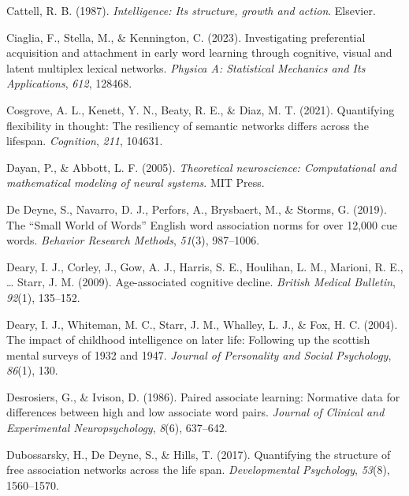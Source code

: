 \documentclass[
  man,floatsintext]{apa6}
\newlength{\cslhangindent}
\newlength{\cslentryspacingunit} %
\newenvironment{CSLReferences}[2] %
 {%
  \setlength{\parindent}{0pt}
  \ifodd #1
  \let\oldpar\par
  \def\par{\hangindent=\cslhangindent\oldpar}
  \fi
  \setlength{\parskip}{#2\cslentryspacingunit}
 }%
 {}
\begin{document}
\begin{CSLReferences}{1}{0}
\leavevmode{}%
Cattell, R. B. (1987). \emph{Intelligence: Its structure, growth and action}. Elsevier.

\leavevmode{}%
Ciaglia, F., Stella, M., \& Kennington, C. (2023). Investigating preferential acquisition and attachment in early word learning through cognitive, visual and latent multiplex lexical networks. \emph{Physica A: Statistical Mechanics and Its Applications}, \emph{612}, 128468.

\leavevmode{}%
Cosgrove, A. L., Kenett, Y. N., Beaty, R. E., \& Diaz, M. T. (2021). Quantifying flexibility in thought: The resiliency of semantic networks differs across the lifespan. \emph{Cognition}, \emph{211}, 104631.

\leavevmode{}%
Dayan, P., \& Abbott, L. F. (2005). \emph{Theoretical neuroscience: Computational and mathematical modeling of neural systems}. MIT Press.

\leavevmode{}%
De Deyne, S., Navarro, D. J., Perfors, A., Brysbaert, M., \& Storms, G. (2019). {The {``Small World of Words''} English word association norms for over 12,000 cue words}. \emph{Behavior Research Methods}, \emph{51}(3), 987--1006.

\leavevmode{}%
Deary, I. J., Corley, J., Gow, A. J., Harris, S. E., Houlihan, L. M., Marioni, R. E., \ldots{} Starr, J. M. (2009). Age-associated cognitive decline. \emph{British Medical Bulletin}, \emph{92}(1), 135--152.

\leavevmode{}%
Deary, I. J., Whiteman, M. C., Starr, J. M., Whalley, L. J., \& Fox, H. C. (2004). The impact of childhood intelligence on later life: Following up the scottish mental surveys of 1932 and 1947. \emph{Journal of Personality and Social Psychology}, \emph{86}(1), 130.

\leavevmode{}%
Desrosiers, G., \& Ivison, D. (1986). Paired associate learning: Normative data for differences between high and low associate word pairs. \emph{Journal of Clinical and Experimental Neuropsychology}, \emph{8}(6), 637--642.

\leavevmode{}%
Dubossarsky, H., De Deyne, S., \& Hills, T. (2017). Quantifying the structure of free association networks across the life span. \emph{Developmental Psychology}, \emph{53}(8), 1560--1570.


\end{CSLReferences}
\end{document}
